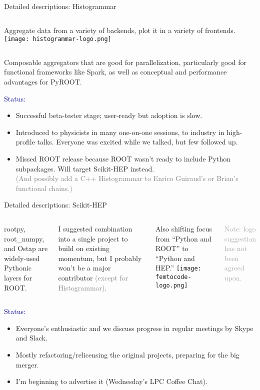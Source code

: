 \begin{frame}{Detailed descriptions: Histogrammar}
\vspace{0.6 cm}
\begin{columns}
Aggregate data from a variety of backends, plot it in a variety of frontends.
\texttt{[image: histogrammar-logo.png]}
\end{columns}

\vspace{0.4 cm}
Composable aggregators that are good for parallelization, particularly good for functional frameworks like Spark, as well as conceptual and performance advantages for PyROOT.

\vspace{0.4 cm}
\textcolor{darkblue}{Status:}
\begin{itemize}
\item Successful beta-tester stage; user-ready but adoption is slow.
\item Introduced to physicists in many one-on-one sessions, to industry in high-profile talks. Everyone was excited while we talked, but few followed up.
\item Missed ROOT release because ROOT wasn't ready to include Python subpackages. Will target Scikit-HEP instead. \\ \textcolor{gray}{(And possibly add a C++ Histogrammar to Enrico Guiraud's or Brian's functional chains.)}
\end{itemize}
\end{frame}

\begin{frame}{Detailed descriptions: Scikit-HEP}
\vspace{0.5 cm}
\begin{columns}
rootpy, root\_numpy, and Ostap are widely-used Pythonic layers for ROOT.

\vspace{0.2 cm}
I suggested combination into a single project to build on existing momentum, but I probably won't be a major contributor \textcolor{gray}{(except for Histogrammar)}.

\vspace{0.2 cm}
Also shifting focus from ``Python and ROOT'' to ``Python and HEP.''
\scriptsize
\texttt{[image: femtocode-logo.png]}

\textcolor{darkgray}{Note: logo suggestion has not been agreed upon.}
\end{columns}

\vspace{0.4 cm}
\textcolor{darkblue}{Status:}
\begin{itemize}
\item Everyone's enthusiastic and we discuss progress in regular meetings by Skype and Slack.
\item Mostly refactoring/relicensing the original projects, preparing for the big merger.
\item I'm beginning to advertise it (Wednesday's LPC Coffee Chat).
\end{itemize}
\end{frame}

